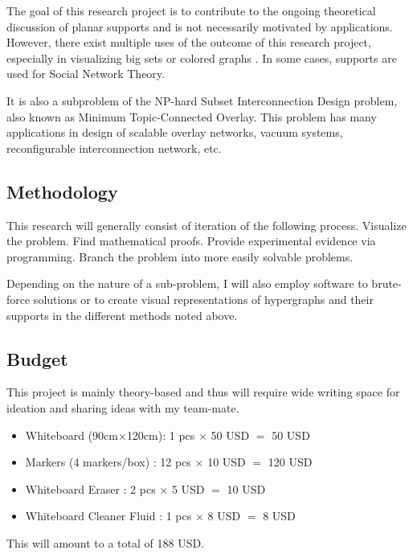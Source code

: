 \documentclass{NSF}
\begin{document}
The goal of this research project is to contribute to the ongoing theoretical discussion of planar supports and is not necessarily motivated by applications. However, there exist multiple uses of the outcome of this research project, especially in visualizing big sets \cite{meulemans2013} or colored graphs \cite{hurtado2017}. In some cases, supports are used for Social Network Theory.

It is also a subproblem of the NP-hard Subset Interconnection Design problem, also known as Minimum Topic-Connected Overlay. This problem has many applications in design of scalable overlay networks, vacuum systems, reconfigurable interconnection network, etc. \cite{Chen2015}



\subsection{Methodology}

This research will generally consist of iteration of the following process. Visualize the problem. Find mathematical proofs. Provide experimental evidence via programming. Branch the problem into more easily solvable problems. 

Depending on the nature of a sub-problem, I will also employ software to brute-force solutions or to create visual representations of hypergraphs and their supports in the different methods noted above.

  
\subsection{Budget}

This project is mainly theory-based and thus will require wide writing space for ideation and sharing ideas with my team-mate. 

\begin{itemize}
\item Whiteboard (90cm$\times$120cm): 1 pcs $\times$ 50 USD $=$ 50 USD 
\item Markers (4 markers/box) : 12 pcs $\times$ 10 USD $=$ 120 USD 
\item Whiteboard Eraser : 2 pcs $\times$ 5 USD $=$ 10 USD
\item Whiteboard Cleaner Fluid : 1 pcs $\times$ 8 USD $=$ 8 USD
\end{itemize}

This will amount to a total of 188 USD.



\renewcommand\refname{References}


\end{document}
